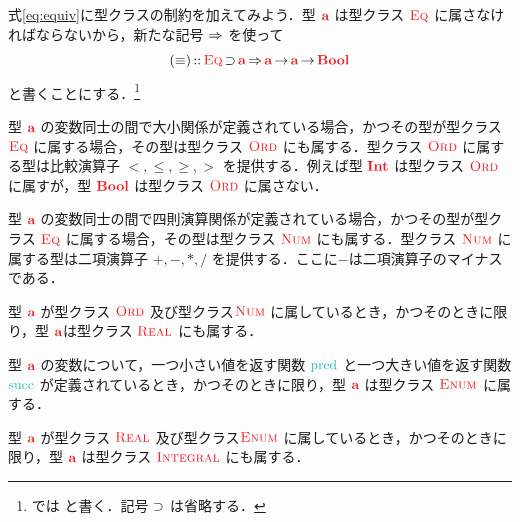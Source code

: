 \documentclass[a5paper,twoside,fleqn,draft]{jsbook}
\begin{document}
式\eqref{eq:equiv}に型クラスの制約を加えてみよう．型 $\hTypeName{a}$ は型クラス $\hEq$ に属さなければならないから，新たな記号 $\operatorname{\Rightarrow}$ を使って
\begin{equation}
  (\hIfEq)
  \hIsTypeOf{}\hEq\hHasElementsOf\hTypeName{a}
  \hAndThen\hTypeName{a}\hFunctionArrow\hTypeName{a}\hFunctionArrow\hBool
\end{equation}
と書くことにする．\footnote{\haskell では  と書く．記号 $\operatorname{\supset}$ は省略する．}

型 $\hTypeName{a}$ の変数同士の間で大小関係が定義されている場合，かつその型が型クラス $\hEq$ に属する場合，その型は型クラス $\hOrd$ にも属する．型クラス $\hOrd$ に属する型は比較演算子 $<,\le,\ge,>$ を提供する．例えば型 $\hInt$ は型クラス $\hOrd$ に属すが，型 $\hBool$ は型クラス $\hOrd$ に属さない．

型 $\hTypeName{a}$ の変数同士の間で四則演算関係が定義されている場合，かつその型が型クラス $\hEq$ に属する場合，その型は型クラス $\hNum$ にも属する．型クラス $\hNum$ に属する型は二項演算子 $+,-,*,/$ を提供する．ここに$-$は二項演算子のマイナスである．

型 $\hTypeName{a}$ が型クラス $\hOrd$ 及び型クラス$\hNum$ に属しているとき，かつそのときに限り，型 $\hTypeName{a}$は型クラス $\hReal$ にも属する．

型 $\hTypeName{a}$ の変数について，一つ小さい値を返す関数 $\hPred$ と一つ大きい値を返す関数 $\hSucc$ が定義されているとき，かつそのときに限り，型 $\hTypeName{a}$ は型クラス $\hEnum$ に属する．

型 $\hTypeName{a}$ が型クラス $\hReal$ 及び型クラス$\hEnum$ に属しているとき，かつそのときに限り，型 $\hTypeName{a}$ は型クラス $\hIntegral$ にも属する．


\separator
\end{document}
